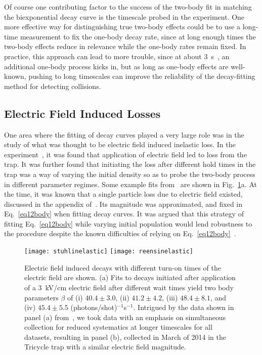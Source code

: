 Of course one contributing factor to the success of the two-body fit in matching the biexponential decay curve is the timescale probed in the experiment.
One more effective way for distinguishing true two-body effects could be to use a long-time measurement to fix the one-body decay rate, since at long enough times the two-body effects reduce in relevance while the one-body rates remain fixed.
In practice, this approach can lead to more trouble, since at about $3$~s~\cite{Hoekstra2007}, an additional one-body process kicks in, but as long as one-body effects are well-known, pushing to long timescales can improve the reliability of the decay-fitting method for detecting collisions.

\subsection{Electric Field Induced Losses}\label{sec:efil}

One area where the fitting of decay curves played a very large role was in the study of what was thought to be electric field induced inelastic loss.
In the experiment~\cite{Stuhl2013}, it was found that application of electric field led to loss from the trap. 
It was further found that initiating the loss after different hold times in the trap was a way of varying the initial density so as to probe the two-body process in different parameter regimes.
Some example fits from~\cite{Stuhl2013} are shown in Fig.~\ref{efielddecay}a.
At the time, it was known that a single particle loss due to electric field existed, discussed in the appendix of~\cite{Stuhl2013}.
Its magnitude was approximated, and fixed in Eq.~\ref{eq12body} when fitting decay curves.
It was argued that this strategy of fitting Eq.~\ref{eq12body} while varying initial population would lend robustness to the procedure despite the known difficulties of relying on Eq.~\ref{eq12body}~\citep[Page.~1800, bottom right]{Stuhl2013}.

\begin{figure}[t!]
\centering
\vspace{0.25in}
\texttt{[image: stuhlinelastic]}
\texttt{[image: reensinelastic]}
\caption[Electric Field Induced Decays]{
Electric field induced decays with different turn-on times of the electric field are shown.
(a) Fits to decays initiated after application of a $3$~kV/cm electric field after different wait times yield two body parameters $\beta$ of (i) $40.4\pm3.0$, (ii) $41.2\pm4.2$, (iii) $48.4\pm8.1$, and (iv) $45.4\pm5.5$ (photons/shot)$^{-1}$s$^{-1}$. 
Intrigued by the data shown in panel (a) from~\cite{Stuhl2013}, we took data with an emphasis on simultaneous collection for reduced systematics at longer timescales for all datasets, resulting in panel (b), collected in March of 2014 in the Tricycle trap with a similar electric field magnitude.
\label{efielddecay}}
\end{figure}


